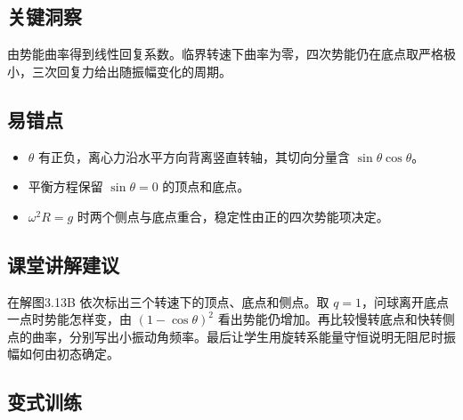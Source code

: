 \documentclass[UTF8,fontset=fandol,a4paper,11pt]{ctexart}
\begin{document}


\subsection*{关键洞察}

由势能曲率得到线性回复系数。临界转速下曲率为零，四次势能仍在底点取严格极小，三次回复力给出随振幅变化的周期。



\subsection*{易错点}

\begin{itemize}
\item $\theta$ 有正负，离心力沿水平方向背离竖直转轴，其切向分量含 $\sin\theta\cos\theta$。
\item 平衡方程保留 $\sin\theta=0$ 的顶点和底点。
\item $\omega^2R=g$ 时两个侧点与底点重合，稳定性由正的四次势能项决定。
\end{itemize}



\subsection*{课堂讲解建议}

在解图3.13B 依次标出三个转速下的顶点、底点和侧点。取 $q=1$，问球离开底点一点时势能怎样变，由 $(1-\cos\theta)^2$ 看出势能仍增加。再比较慢转底点和快转侧点的曲率，分别写出小振动角频率。最后让学生用旋转系能量守恒说明无阻尼时振幅如何由初态确定。



\subsection*{变式训练}
\end{document}
